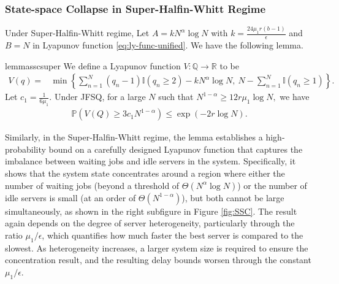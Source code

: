 \documentclass[11pt,oneside,letter]{article}
\begin{document}
\subsubsection*{State-space Collapse in Super-Halfin-Whitt Regime}
Under Super-Halfin-Whitt regime, Let $A= k N^\alpha \log N$ with $k = \frac{24\mu_1r(b-1)}{\epsilon}$ and $B= N$ in Lyapunov function \eqref{eq:ly-func-unified}. We have the following lemma. 
\begin{restatable}{lemma}{sscsuper}\label{lem:SSC-super}
We define a Lyapunov function $V: \mathbb Q \to \mathbb R$ to be
\begin{align}
V(q)=&\min\left\{\sum_{n=1}^{N} (q_n-1)\mathbb{I}(q_n\geq 2) - k N^\alpha \log N, ~ N - \sum_{n=1}^{N} \mathbb{I}(q_n\geq 1) \right\}. \label{ly-func}
\end{align}
Let $c_1=\frac{1}{6\mu_{1}}.$ Under JFSQ, for a large $N$ such that $N^{1-\alpha} \geq 12 r \mu_1 \log N,$ we have 
\begin{align*}
  \mathbb P\left(V(Q)\geq 3c_1  N^{1-\alpha}\right)
  \leq  \exp\left(- 2r\log N\right).  
\end{align*} 
\end{restatable}
Similarly, in the Super-Halfin-Whitt regime, the lemma establishes a high-probability bound on a carefully designed Lyapunov function that captures the imbalance between waiting jobs and idle servers in the system. Specifically, it shows that the system state concentrates around a region where either the number of waiting jobs (beyond a threshold of $\Theta(N^\alpha \log N)$) or the number of idle servers is small (at an order of $\Theta(N^{1-\alpha})$), but both cannot be large simultaneously, as shown in the right subfigure in Figure \ref{fig:SSC}. 
The result again depends on the degree of server heterogeneity, particularly through the ratio $\mu_1 / \epsilon$, which quantifies how much faster the best server is compared to the slowest. As heterogeneity increases, a larger system size is required to ensure the concentration result, and the resulting delay bounds worsen through the constant $\mu_1 / \epsilon$. 
\end{document}
